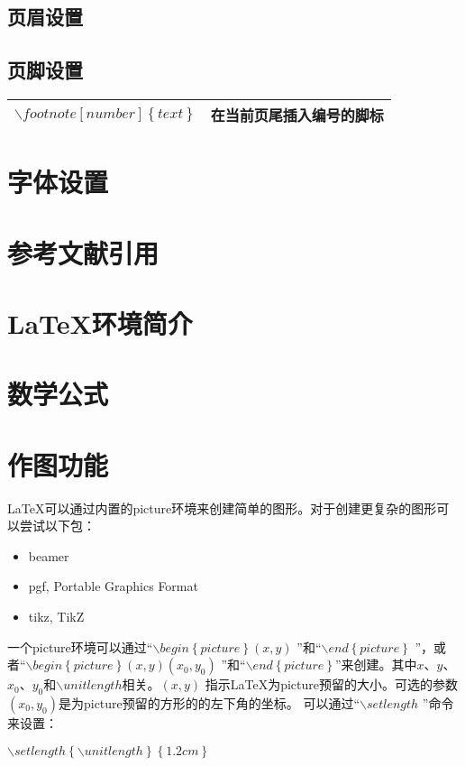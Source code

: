 \documentclass[11pt]{book}
\begin{document}
		\subsection{页眉设置}
		\subsection{页脚设置}
		\begin{tabular}{|l|l|}
			\hline
			$ \backslash footnote[number]\left\lbrace text\right\rbrace $ & 在当前页尾插入编号的脚标 \\
			\hline
		\end{tabular}
		\section{字体设置}

		\section{参考文献引用}
		\section{\LaTeX 环境简介}
		\section{数学公式}
		\section{作图功能}
		\LaTeX 可以通过内置的picture环境来创建简单的图形。对于创建更复杂的图形可以尝试以下包：
		\begin{itemize}
			\item beamer
			\item pgf, Portable Graphics Format
			\item tikz, TikZ
		\end{itemize}
	
		一个picture环境可以通过“$ \backslash begin\left\{picture\right\}(x, y)$ ”和“$ \backslash end\left\{picture\right\}$ ”，或者“$ \backslash begin\left\{picture\right\}(x, y)(x_0, y_0)$ ”和“$ \backslash end\left\{picture\right\}$”来创建。其中$ x $、$ y $、$ x_0 $、$ y_0 $和$ \backslash unitlength $相关。$ (x, y) $ 指示\LaTeX 为picture预留的大小。可选的参数$ (x_0, y_0)$是为picture预留的方形的的左下角的坐标。
		可以通过“$ \backslash setlength$ ”命令来设置：
		\begin{center}
			$ \backslash setlength\left\lbrace \backslash unitlength \right\rbrace \left\lbrace 1.2cm \right\rbrace$
		\end{center}
	
\end{document}
